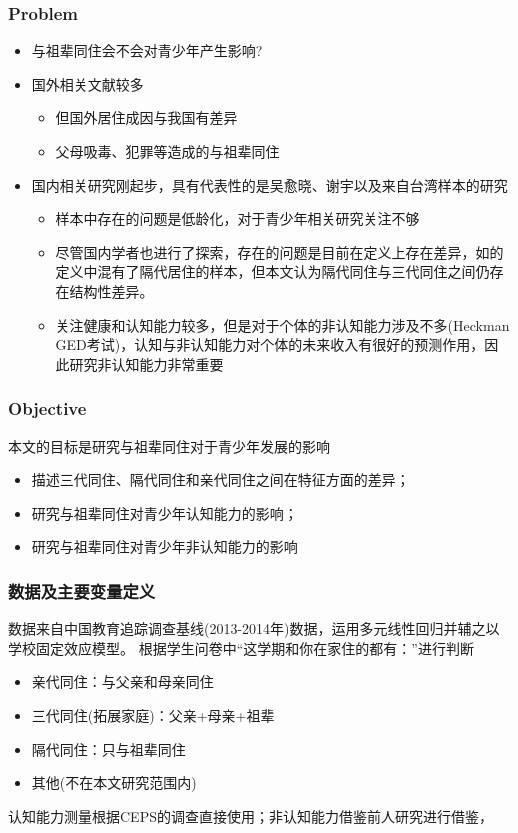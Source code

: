 \documentclass{beamer}
\begin{document}
\begin{frame}
\frametitle{Problem} 
	\begin{itemize}
		\item 与祖辈同住会不会对青少年产生影响?
		\item 国外相关文献较多
		\begin{itemize}
			\item 但国外居住成因与我国有差异
			\item 父母吸毒、犯罪等造成的与祖辈同住
 		\end{itemize}
		\item 国内相关研究刚起步，具有代表性的是吴愈晓\citep{吴愈晓2018,张帆2020}、谢宇\citep{zeng_effects_2014}以及来自台湾样本的研究\citep{zeng_effects_2014}
		\begin{itemize}
			\item 样本中存在的问题是低龄化，对于青少年相关研究关注不够
			\item 尽管国内学者也进行了探索，存在的问题是目前在定义上存在差异，如\citet{张帆2020}的定义中混有了隔代居住的样本，但本文认为隔代同住与三代同住之间仍存在结构性差异。
			\item 关注健康和认知能力较多，但是对于个体的非认知能力涉及不多(Heckman GED考试)，认知与非认知能力对个体的未来收入有很好的预测作用，因此研究非认知能力非常重要
		\end{itemize}	
	\end{itemize}
\end{frame}

\begin{frame}
	\frametitle{Objective}
	本文的目标是研究与祖辈同住对于青少年发展的影响
	\begin{itemize}
		\item 描述三代同住、隔代同住和亲代同住之间在特征方面的差异；
		\item 研究与祖辈同住对青少年认知能力的影响；
		\item 研究与祖辈同住对青少年非认知能力的影响
	\end{itemize}
\end{frame}


\begin{frame}
	\frametitle{数据及主要变量定义}
数据来自中国教育追踪调查基线(2013-2014年)数据，运用多元线性回归并辅之以学校固定效应模型。
根据学生问卷中“这学期和你在家住的都有：”进行判断
	\begin{itemize}
		\item 亲代同住：与父亲和母亲同住\citep{brown_marriage_2010}
		\item 三代同住(拓展家庭)：父亲+母亲+祖辈
		\item 隔代同住：只与祖辈同住
		\item 其他(不在本文研究范围内)
	\end{itemize}
	认知能力测量根据CEPS的调查直接使用；非认知能力借鉴前人研究进行借鉴，
\end{frame}
\end{document}
